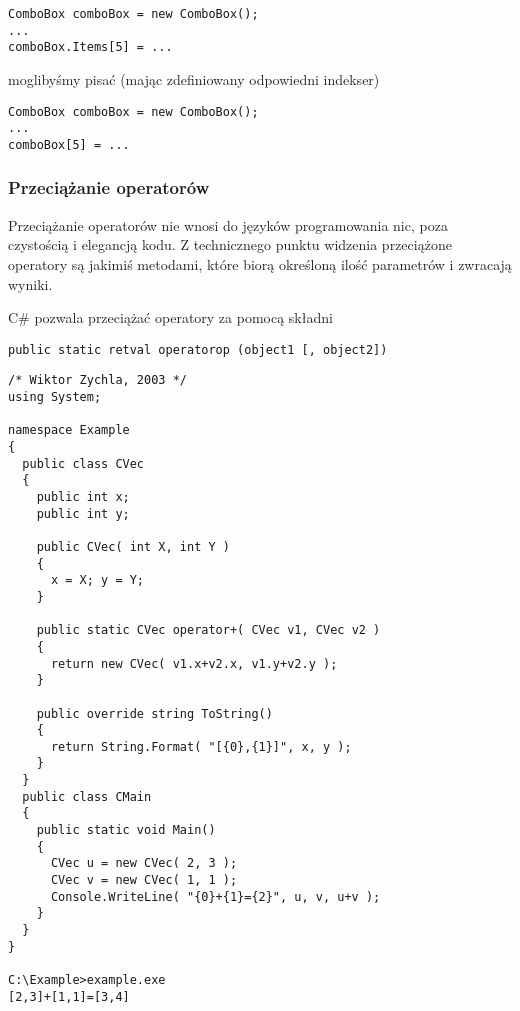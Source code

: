 \begin{scriptsize}
\begin{verbatim}
ComboBox comboBox = new ComboBox();
...
comboBox.Items[5] = ...
\end{verbatim}
\end{scriptsize}

moglibyśmy pisać (mając zdefiniowany odpowiedni indekser)

\begin{scriptsize}
\begin{verbatim}
ComboBox comboBox = new ComboBox();
...
comboBox[5] = ...
\end{verbatim}
\end{scriptsize}

\subsubsection{Przeciążanie operatorów}

Przeciążanie operatorów nie wnosi do języków programowania nic, poza czystością i elegancją kodu. Z
technicznego punktu widzenia przeciążone operatory są jakimiś metodami, które biorą określoną ilość 
parametrów i zwracają wyniki. 

C\# pozwala przeciążać operatory za pomocą składni

\begin{scriptsize}
\begin{verbatim}
public static retval operatorop (object1 [, object2])
\end{verbatim}
\end{scriptsize}

\begin{scriptsize}
\begin{verbatim}
/* Wiktor Zychla, 2003 */
using System;

namespace Example
{
  public class CVec
  {
    public int x;
    public int y;

    public CVec( int X, int Y )
    {
      x = X; y = Y;    
    }

    public static CVec operator+( CVec v1, CVec v2 )
    {
      return new CVec( v1.x+v2.x, v1.y+v2.y );
    }

    public override string ToString()
    {
      return String.Format( "[{0},{1}]", x, y );
    }
  }
  public class CMain
  {    
    public static void Main()
    {
      CVec u = new CVec( 2, 3 );
      CVec v = new CVec( 1, 1 );
      Console.WriteLine( "{0}+{1}={2}", u, v, u+v );
    }
  }
}

C:\Example>example.exe
[2,3]+[1,1]=[3,4]
\end{verbatim}
\end{scriptsize}

